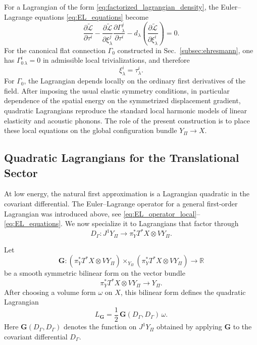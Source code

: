 \documentclass[11pt]{amsart}
\theoremstyle{plain}
\theoremstyle{definition}
\theoremstyle{remark}
\begin{document}
For a Lagrangian of the form \eqref{eq:factorized_lagrangian_density}, the Euler--Lagrange equations \eqref{eq:EL_equations} become
\begin{equation}
	\frac{\partial \widetilde{\mathcal L}}{\partial \tau^i}
	-
	\frac{\partial \widetilde{\mathcal L}}{\partial \xi^j_\lambda}
	\frac{\partial \Gamma^j_\lambda}{\partial \tau^i}
	-
	d_\lambda\!\left(
	\frac{\partial \widetilde{\mathcal L}}{\partial \xi^i_\lambda}
	\right)
	=0.
	\label{eq:EL_factorized}
\end{equation}
For the canonical flat connection \(\Gamma_0\) constructed in Sec.~\ref{subsec:ehresmann}, one has \(\Gamma^i_{0\,\lambda}=0\) in admissible local trivializations, and therefore
\[
\xi^i_\lambda=\tau^i_\lambda.
\]
For \(\Gamma_0\), the Lagrangian depends locally on the ordinary first derivatives of the field. 
After imposing the usual elastic symmetry conditions, in particular dependence of the spatial energy on the symmetrized displacement gradient, quadratic Lagrangians reproduce the standard local harmonic models of linear elasticity and acoustic phonons. 
The role of the present construction is to place these local equations on the global configuration bundle \(Y_\Pi\to X\).

\subsection{Quadratic Lagrangians for the Translational Sector}
\label{subsec:quadratic_phonon_lagrangians}

At low energy, the natural first approximation is a Lagrangian quadratic in the covariant differential. 
The Euler--Lagrange operator for a general first-order Lagrangian was introduced above, see \eqref{eq:EL_operator_local}--\eqref{eq:EL_equations}. 
We now specialize it to Lagrangians that factor through
\[
D_\Gamma:J^1Y_\Pi\to \pi_Y^*T^*X\otimes VY_\Pi.
\]

Let
\begin{equation}
	\mathbf G:
	\left(\pi_Y^*T^*X\otimes VY_\Pi\right)
	\times_{Y_\Pi}
	\left(\pi_Y^*T^*X\otimes VY_\Pi\right)
	\longrightarrow \mathbb R
	\label{eq:bundle_metric_quadratic}
\end{equation}
be a smooth symmetric bilinear form on the vector bundle
\[
\pi_Y^*T^*X\otimes VY_\Pi \to Y_\Pi.
\]
After choosing a volume form \(\omega\) on \(X\), this bilinear form defines the quadratic Lagrangian
\begin{equation}
	L_{\mathbf G}
	=
	\frac12\,\mathbf G(D_\Gamma,D_\Gamma)\,\omega.
	\label{eq:quadratic_lagrangian_global}
\end{equation}
Here \(\mathbf G(D_\Gamma,D_\Gamma)\) denotes the function on \(J^1Y_\Pi\) obtained by applying \(\mathbf G\) to the covariant differential \(D_\Gamma\).
\end{document}
